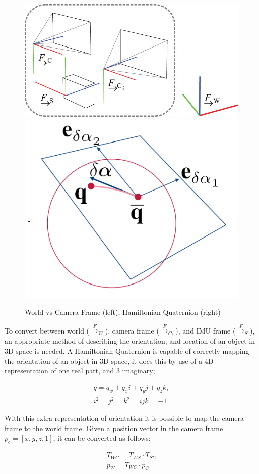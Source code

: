 \documentclass[a4paper,11pt,notitlepage]{article}
\begin{document}
\noindent \begin{figure}[h!]
\includegraphics[width = 0.5\hsize]{figures/world_to_cam.jpg}
\includegraphics[width = 0.35\hsize]{figures/quaternions.png}
\caption{World vs Camera Frame (left)\cite{Okvis_1}, Hamiltonian Quaternion (right)}
\label{quat_wcs}
\end{figure}


To convert between world (${\xrightarrow{F}}_{W}$), camera frame (${\xrightarrow{F}}_{C_{i}}$), and IMU frame (${\xrightarrow{F}}_{S}$), an appropriate method of describing the orientation, and location of an object in 3D space is needed. A Hamiltonian Quaternion is capable of correctly mapping the orientation of an object in 3D space, it does this by use of a 4D representation of one real part, and 3 imaginary;  

\begin{equation}
\begin{aligned}
\label{quaternion}
q = q_{w} + q_{x}i + q_{y}j+q_{z}k, \\
i^{2}=j^{2}=k^{2}=ijk=-1
\end{aligned}
\end{equation}

With this extra representation of orientation it is possible to map the camera frame to the world frame. Given a position vector in the camera frame $p_{c} = [x,y,z,1]$, it can be converted as follows:


\begin{equation}
\begin{aligned}
T_{WC} = T_{WS} \cdot T_{SC} \\
p_{W} = T_{WC} \cdot p_{C} \\
\end{aligned}
\label{matmul_w2c}
\end{equation}
\end{document}
